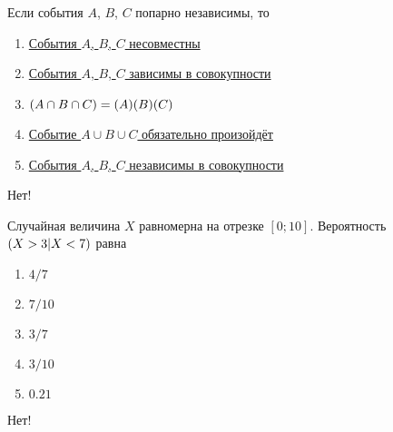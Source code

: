 \documentclass[t]{beamer}
\let\P\relax
\DeclareMathOperator{\P}{\mathbb{P}}
\begin{document}
 \begin{frame} \label{5-No} 
\begin{block}{5} 

Если события $A$, $B$, $C$ попарно независимы, то


 \end{block} 
\begin{enumerate} 
\item[] \hyperlink{5-No}{\beamergotobutton{} События $A$, $B$, $C$ несовместны}
\item[] \hyperlink{5-No}{\beamergotobutton{} События $A$, $B$, $C$ зависимы в совокупности}
\item[] \hyperlink{5-No}{\beamergotobutton{} $\P(A\cap B\cap C)=\P(A)\P(B)\P(C)$
}
\item[] \hyperlink{5-No}{\beamergotobutton{} Событие $A\cup B\cup C$ обязательно произойдёт}
\item[] \hyperlink{5-No}{\beamergotobutton{} События $A$, $B$, $C$ независимы в совокупности}
\end{enumerate} 

 \alert{Нет!} 
\end{frame} 


 \begin{frame} \label{6-No} 
\begin{block}{6} 

Случайная величина $X$ равномерна на отрезке $[0;10]$. Вероятность $\P(X>3|X<7)$ равна
     


 \end{block} 
\begin{enumerate} 
\item[] \hyperlink{6-Yes}{\beamergotobutton{} $4/7$}
\item[] \hyperlink{6-No}{\beamergotobutton{} $7/10$}
\item[] \hyperlink{6-No}{\beamergotobutton{} $3/7$}
\item[] \hyperlink{6-No}{\beamergotobutton{} $3/10$}
\item[] \hyperlink{6-No}{\beamergotobutton{} $0.21$
}
\end{enumerate} 

 \alert{Нет!} 
\end{frame} 
\end{document}
